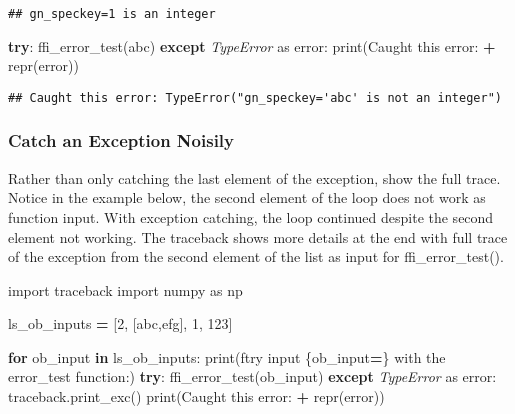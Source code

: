 \documentclass[
]{book}
\newenvironment{Shaded}{\begin{snugshade}}{\end{snugshade}}
\newcommand{\BuiltInTok}[1]{#1}
\newcommand{\ControlFlowTok}[1]{\textcolor[rgb]{0.13,0.29,0.53}{\textbf{#1}}}
\newcommand{\DecValTok}[1]{\textcolor[rgb]{0.00,0.00,0.81}{#1}}
\newcommand{\ImportTok}[1]{#1}
\newcommand{\KeywordTok}[1]{\textcolor[rgb]{0.13,0.29,0.53}{\textbf{#1}}}
\newcommand{\NormalTok}[1]{#1}
\newcommand{\OperatorTok}[1]{\textcolor[rgb]{0.81,0.36,0.00}{\textbf{#1}}}
\newcommand{\PreprocessorTok}[1]{\textcolor[rgb]{0.56,0.35,0.01}{\textit{#1}}}
\newcommand{\SpecialCharTok}[1]{\textcolor[rgb]{0.00,0.00,0.00}{#1}}
\newcommand{\SpecialStringTok}[1]{\textcolor[rgb]{0.31,0.60,0.02}{#1}}
\newcommand{\StringTok}[1]{\textcolor[rgb]{0.31,0.60,0.02}{#1}}
\begin{document}
\begin{verbatim}
## gn_speckey=1 is an integer
\end{verbatim}

\begin{Shaded}
\begin{Highlighting}[]
\ControlFlowTok{try}\NormalTok{:}
\NormalTok{    ffi\_error\_test(}\StringTok{\textquotesingle{}abc\textquotesingle{}}\NormalTok{)}
\ControlFlowTok{except} \PreprocessorTok{TypeError} \ImportTok{as}\NormalTok{ error:}
    \BuiltInTok{print}\NormalTok{(}\StringTok{\textquotesingle{}Caught this error: \textquotesingle{}} \OperatorTok{+} \BuiltInTok{repr}\NormalTok{(error))}
\end{Highlighting}
\end{Shaded}

\begin{verbatim}
## Caught this error: TypeError("gn_speckey='abc' is not an integer")
\end{verbatim}

\hypertarget{catch-an-exception-noisily}{%
\subsubsection{Catch an Exception Noisily}\label{catch-an-exception-noisily}}

Rather than only catching the last element of the exception, show the full trace. Notice in the example below, the second element of the loop does not work as function input. With exception catching, the loop continued despite the second element not working. The traceback shows more details at the end with full trace of the exception from the second element of the list as input for ffi\_error\_test().

\begin{Shaded}
\begin{Highlighting}[]
\ImportTok{import}\NormalTok{ traceback}
\ImportTok{import}\NormalTok{ numpy }\ImportTok{as}\NormalTok{ np}

\NormalTok{ls\_ob\_inputs }\OperatorTok{=}\NormalTok{ [}\DecValTok{2}\NormalTok{, [}\StringTok{\textquotesingle{}abc\textquotesingle{}}\NormalTok{,}\StringTok{\textquotesingle{}efg\textquotesingle{}}\NormalTok{], }\DecValTok{1}\NormalTok{, }\DecValTok{123}\NormalTok{]}

\ControlFlowTok{for}\NormalTok{ ob\_input }\KeywordTok{in}\NormalTok{ ls\_ob\_inputs:}
    \BuiltInTok{print}\NormalTok{(}\SpecialStringTok{f\textquotesingle{}try input }\SpecialCharTok{\{}\NormalTok{ob\_input}\OperatorTok{=}\SpecialCharTok{\}}\SpecialStringTok{ with the error\_test function:\textquotesingle{}}\NormalTok{)}
    \ControlFlowTok{try}\NormalTok{:}
\NormalTok{        ffi\_error\_test(ob\_input)}
    \ControlFlowTok{except} \PreprocessorTok{TypeError} \ImportTok{as}\NormalTok{ error:}
\NormalTok{        traceback.print\_exc()}
        \BuiltInTok{print}\NormalTok{(}\StringTok{\textquotesingle{}Caught this error: \textquotesingle{}} \OperatorTok{+} \BuiltInTok{repr}\NormalTok{(error))}
\end{Highlighting}
\end{Shaded}
\end{document}
